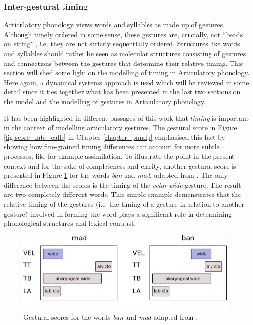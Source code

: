 \subsubsection{Inter-gestural timing}

Articulatory phonology views words and syllables as made up of gestures. Although timely ordered in some sense, these gestures are, crucially, not ``beads on string" \citep{Pouplier2011}, i.e. they are not strictly sequentially ordered. Structures like words and syllables should rather be seen as molecular structures \citep{NamGoldsteinSaltzman2009} consisting of gestures and connections between the gestures that determine their relative timing. This section will shed some light on the modelling of timing in Articulatory phonology. Here again, a dynamical systems approach is used which will be reviewed in some detail since it ties together what has been presented in the last two sections on the \citet{HakenKelsoBunz1985} model and the modelling of gestures in Articulatory phonology. 

It has been highlighted in different passages of this work that \emph{timing} is important in the context of  modelling articulatory gestures. The gestural score in Figure \ref{fig:score_late_calls} in Chapter \ref{chapter_pandp} emphasised this fact by showing how fine-grained timing differences can account for more subtle processes, like for example assimilation. To illustrate the point in the present context and for the sake of completeness and clarity, another gestural score is presented in Figure \ref{fig:ban_mad} for the words \emph{ban} and \emph{mad}, adapted from \citet{Goldsteinetal2009}. The only difference between the scores is the timing of the \emph{velar wide} gesture. The result are two completely different words. This simple example demonstrates that the relative timing of the gestures (i.e. the timing of a gesture in relation to another gesture) involved in forming the word plays a significant role in determining phonological structures and lexical contrast. 

\begin{figure}
\includegraphics[width=11cm]{figures/ch3/ban_mad.pdf}
\caption{Gestural scores for the words \emph{ban} and \emph{mad} adapted from \citet{Goldsteinetal2009}.}
\label{fig:ban_mad}
\end{figure}


